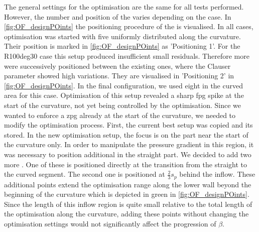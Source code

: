The general settings for the optimisation are the same for all tests performed.
However, the number and position of the  varies depending on the case.
In \autoref{fig:OF_designPOints} the positioning procedure of the  is visualised.
In all cases, optimisation was started with five  uniformly distributed along the curvature.  
Their position is marked in \autoref{fig:OF_designPOints} as 'Positioning 1'.
For the R100deg30 case this setup produced insufficient small residuals. 
Therefore  more  were successively positioned  between the existing ones,  where the Clauser parameter showed high variations.
They are visualised in 'Positioning 2' in \autoref{fig:OF_designPOints}.
In the final configuration, we used eight  in the curved area for this case.
Optimisation of this setup revealed a sharp \acrshort{fpg} spike at the start of the curvature, not yet being controlled by the optimisation.
Since we wanted to enforce a \acrshort{zpg} already at the start of the curvature, we needed to modify the optimisation process.
First, the current best setup was copied and its  stored. 
In the new optimisation setup, the focus is on the part near the start of the curvature only.
In order to manipulate the pressure gradient in this region, it was necessary to position additional  in the straight part. 
We decided to add two more .
One of these is positioned directly at the transition from the straight to the curved segment.
The second one is positioned at $\frac{2}{3}s_p$ behind the inflow.
These additional points extend the optimisation range along the lower wall beyond the beginning of the curvature which is depicted in green in \autoref{fig:OF_designPOints}. 
Since the length of this inflow region is quite small relative to the total  length of the optimisation  along the curvature, adding these points without changing the optimisation settings would not significantly affect the progression of $\beta$.

